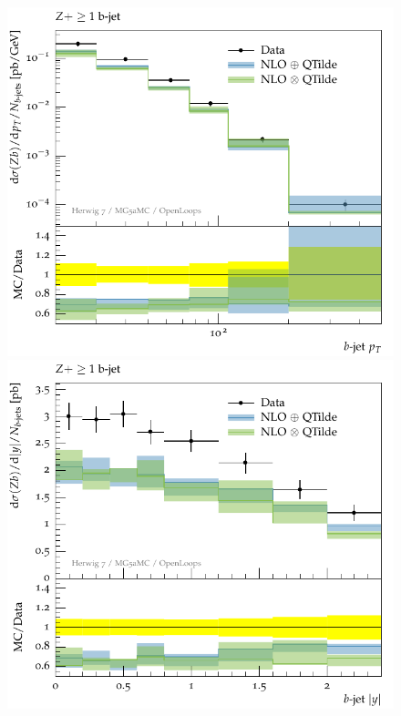 \documentclass[11pt]{cernrep}
\begin{document}
\begin{figure}[htbp]
\begin{center}
   \includegraphics[scale=0.65]{figs/zbb/herwig4F/atlas-d03-x01-y01.pdf} 
   \includegraphics[scale=0.65]{figs/zbb/herwig4F/atlas-d05-x01-y01.pdf} \\

\end{center}
\end{figure}
\end{document}
